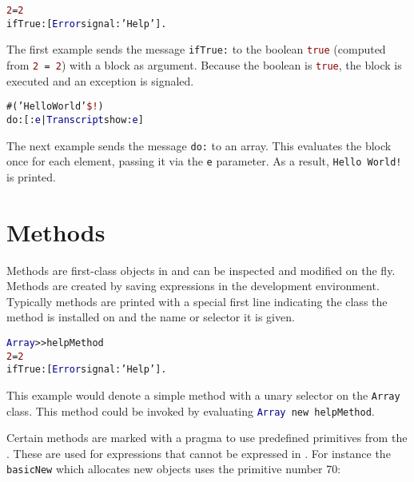 \begin{alltt}
\textcolor{darkRed}{2} = \textcolor{darkRed}{2}
  ifTrue: [ \textcolor{darkBlue}{Error} signal: \textcolor{string}{'Help'} ].
\end{alltt}

The first example sends the message \texttt{ifTrue:} to the boolean
\textcolor{darkRed}{\texttt{true}} (computed from \texttt{\textcolor{darkRed}{2} = \textcolor{darkRed}{2}}) with a block as argument.
Because the boolean is \textcolor{darkRed}{\texttt{true}}, the block is executed and an exception is signaled.

\begin{alltt}
\#(\textcolor{string}{'Hello World'} \textcolor{darkRed}{\$!})
  do: [ :\textcolor{darkBlue}{e} | \textcolor{darkBlue}{Transcript} show: \textcolor{darkBlue}{e} ]
\end{alltt}

The next example sends the message \texttt{do:} to an array.
This evaluates the block once for each element, passing it via the \texttt{e} parameter.
As a result, \texttt{\textcolor{string}{Hello~World!}} is printed.


\section{Methods}

Methods are first-class objects in \PH and can be inspected and modified on the fly.
Methods are created by saving expressions in the \PH development environment.
Typically methods are printed with a special first line indicating the class the method is installed on and the name or selector it is given.

\begin{alltt}
\textcolor{darkBlue}{Array} >> helpMethod
    \textcolor{darkRed}{2} = \textcolor{darkRed}{2}
        ifTrue: [ \textcolor{darkBlue}{Error} signal: \textcolor{string}{'Help'} ].
\end{alltt}

This example would denote a simple method with a unary selector on the \texttt{Array} class.
This method could be invoked by evaluating \texttt{\textcolor{darkBlue}{Array} new helpMethod}.

Certain methods are marked with a pragma to use predefined primitives from the \VM.
These are used for expressions that cannot be expressed in \PH.
For instance the \texttt{basicNew} which allocates new objects uses the primitive number 70:

